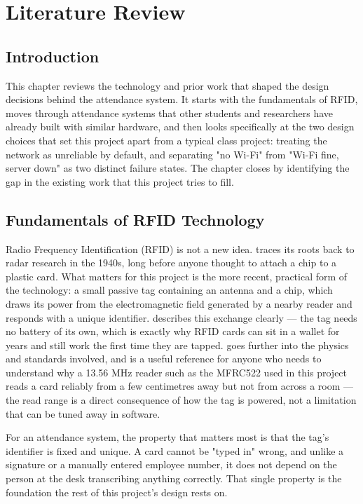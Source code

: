 \chapter{Literature Review}
\label{ch:litreview}

\section{Introduction}

This chapter reviews the technology and prior work that shaped the design decisions behind the attendance system. It starts with the fundamentals of RFID, moves through attendance systems that other students and researchers have already built with similar hardware, and then looks specifically at the two design choices that set this project apart from a typical class project: treating the network as unreliable by default, and separating "no Wi-Fi" from "Wi-Fi fine, server down" as two distinct failure states. The chapter closes by identifying the gap in the existing work that this project tries to fill.

\section{Fundamentals of RFID Technology}

Radio Frequency Identification (RFID) is not a new idea. \textcite{landt2005history} traces its roots back to radar research in the 1940s, long before anyone thought to attach a chip to a plastic card. What matters for this project is the more recent, practical form of the technology: a small passive tag containing an antenna and a chip, which draws its power from the electromagnetic field generated by a nearby reader and responds with a unique identifier. \textcite{want2006introduction} describes this exchange clearly — the tag needs no battery of its own, which is exactly why RFID cards can sit in a wallet for years and still work the first time they are tapped. \textcite{finkenzeller2010rfid} goes further into the physics and standards involved, and is a useful reference for anyone who needs to understand why a 13.56 MHz reader such as the MFRC522 used in this project reads a card reliably from a few centimetres away but not from across a room — the read range is a direct consequence of how the tag is powered, not a limitation that can be tuned away in software.

For an attendance system, the property that matters most is that the tag's identifier is fixed and unique. A card cannot be "typed in" wrong, and unlike a signature or a manually entered employee number, it does not depend on the person at the desk transcribing anything correctly. That single property is the foundation the rest of this project's design rests on.

